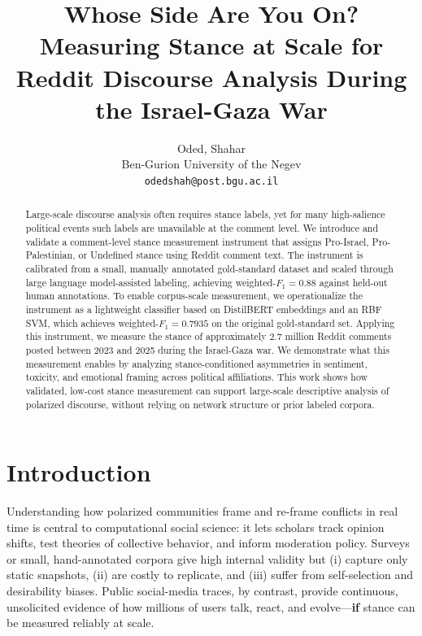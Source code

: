 \documentclass[letterpaper]{article} %
\title{Whose Side Are You On? Measuring Stance at Scale for Reddit Discourse Analysis During the Israel-Gaza War}
\author{
  Oded, Shahar\\
  Ben-Gurion University of the Negev\\
  \texttt{odedshah@post.bgu.ac.il}
}
\begin{document}
\maketitle


\begin{abstract}
Large-scale discourse analysis often requires stance labels, yet for many high-salience political events such labels are unavailable at the comment level. We introduce and validate a comment-level stance measurement instrument that assigns Pro-Israel, Pro-Palestinian, or Undefined stance using Reddit comment text. The instrument is calibrated from a small, manually annotated gold-standard dataset and scaled through large language model-assisted labeling, achieving weighted-$F_{1}=0.88$ against held-out human annotations. To enable corpus-scale measurement, we operationalize the instrument as a lightweight classifier based on DistilBERT embeddings and an RBF SVM, which achieves weighted-$F_{1}=0.7935$ on the original gold-standard set. Applying this instrument, we measure the stance of approximately 2.7 million Reddit comments posted between 2023 and 2025 during the Israel-Gaza war. We demonstrate what this measurement enables by analyzing stance-conditioned asymmetries in sentiment, toxicity, and emotional framing across political affiliations. This work shows how validated, low-cost stance measurement can support large-scale descriptive analysis of polarized discourse, without relying on network structure or prior labeled corpora.
\end{abstract}

\section{Introduction}
\label{sec:introduction}

Understanding how polarized communities frame and re-frame conflicts in real time is central to computational social science: it lets scholars track opinion shifts, test theories of collective behavior, and inform moderation policy. Surveys or small, hand-annotated corpora give high internal validity but (i) capture only static snapshots, (ii) are costly to replicate, and (iii) suffer from self-selection and desirability biases.  Public social-media traces, by contrast, provide continuous, unsolicited evidence of how millions of users talk, react, and evolve---\textbf{if} stance can be measured reliably at scale.
\end{document}
